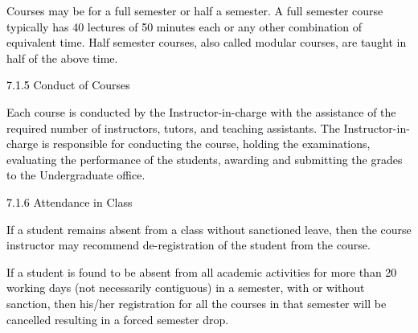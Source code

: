 \documentclass[12pt]{article}
\begin{document}
\vspace{\baselineskip}
\begin{justify}
{\fontsize{10pt}{12.0pt}\selectfont \textcolor[HTML]{00000A}{Courses may be for a full semester or half a semester. A full semester course typically has 40 lectures of 50 minutes each or any other combination of equivalent time. Half semester courses, also called modular courses, are taught in half of the above time.}\par}
\end{justify}\par


\vspace{\baselineskip}
{\fontsize{10pt}{12.0pt}\selectfont \textcolor[HTML]{00000A}{7.1.5 Conduct of Courses}\par}\par


\vspace{\baselineskip}
\begin{justify}
{\fontsize{9pt}{10.8pt}\selectfont \textcolor[HTML]{00000A}{Each course is conducted by the Instructor-in-charge with the assistance of the required number of instructors, tutors, and teaching assistants. The Instructor-in-charge is responsible for conducting the course, holding the examinations, evaluating the performance of the students, awarding and submitting the grades to the Undergraduate office.}\par}
\end{justify}\par


\vspace{\baselineskip}
{\fontsize{10pt}{12.0pt}\selectfont \textcolor[HTML]{00000A}{7.1.6 Attendance in Class}\par}\par


\vspace{\baselineskip}
\begin{justify}
{\fontsize{10pt}{12.0pt}\selectfont \textcolor[HTML]{00000A}{If a student remains absent from a class without sanctioned leave, then the course instructor may recommend de-registration of the student from the course.}\par}
\end{justify}\par


\vspace{\baselineskip}
\begin{justify}
{\fontsize{10pt}{12.0pt}\selectfont \textcolor[HTML]{00000A}{If a student is found to be absent from all academic activities for more than 20 working days (not necessarily contiguous) in a semester, with or without sanction, then his/her registration for all the courses in that semester will be cancelled resulting in a forced semester drop.}\par}
\end{justify}\par
\end{document}
